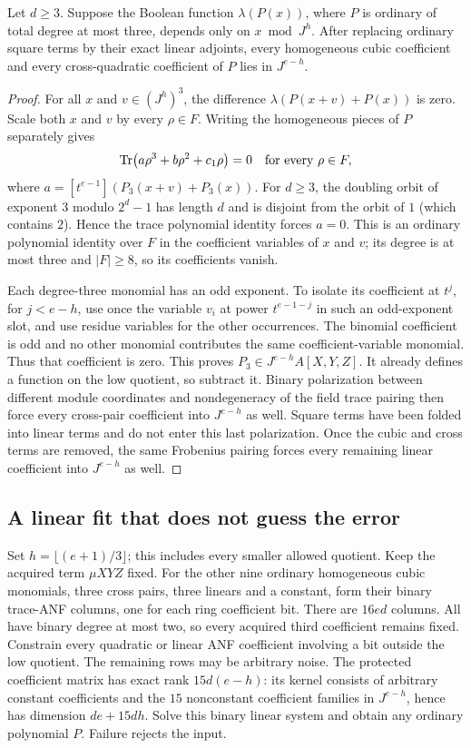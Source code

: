 \begin{lemma}\label{lem:invisible}
Let $d\ge3$. Suppose the Boolean function $\lambda(P(x))$, where $P$ is
ordinary of total degree at most three, depends only on $x\bmod J^h$.
After replacing ordinary square terms by their exact linear adjoints,
every homogeneous cubic coefficient and every cross-quadratic
coefficient of $P$ lies in $J^{e-h}$.
\end{lemma}
\begin{proof}
For all $x$ and $v\in(J^h)^3$, the difference
$\lambda(P(x+v)+P(x))$ is zero. Scale both $x$ and $v$ by every
$\rho\in F$. Writing the homogeneous pieces of $P$ separately gives
\[
 \operatorname{Tr}\bigl(a\rho^3+b\rho^2+c_1\rho\bigr)=0
 \quad\text{for every }\rho\in F,
\]
where $a=[t^{e-1}](P_3(x+v)+P_3(x))$.
For $d\ge3$, the doubling orbit of exponent $3$ modulo $2^d-1$ has
length $d$ and is disjoint from the orbit of $1$ (which contains $2$).
Hence the trace polynomial identity forces $a=0$.
This is an ordinary polynomial identity over $F$ in the coefficient
variables of $x$ and $v$; its degree is at most three and $|F|\ge8$,
so its coefficients vanish.

Each degree-three monomial has an odd exponent. To isolate its coefficient
at $t^j$, for $j<e-h$, use once the variable $v_i$ at power
$t^{e-1-j}$ in such an odd-exponent slot, and use residue variables
for the other occurrences. The binomial coefficient is odd and no other
monomial contributes the same coefficient-variable monomial. Thus that
coefficient is zero. This proves $P_3\in J^{e-h}A[X,Y,Z]$.
It already defines a function on the low quotient, so subtract it.
Binary polarization between different module coordinates and
nondegeneracy of the field trace pairing then force every cross-pair
coefficient into $J^{e-h}$ as well. Square terms have been folded into
linear terms and do not enter this last polarization. Once the cubic and
cross terms are removed, the same Frobenius pairing forces every remaining
linear coefficient into $J^{e-h}$ as well.
\end{proof}

\subsection{A linear fit that does not guess the error}
Set $h=\lfloor(e+1)/3\rfloor$; this includes every smaller allowed quotient.
Keep the acquired term $\mu XYZ$ fixed. For the other nine ordinary
homogeneous cubic monomials, three cross pairs, three linears and a
constant, form their binary trace-ANF columns, one for each ring
coefficient bit. There are $16ed$ columns. All have binary degree at
most two, so every acquired third coefficient remains fixed.
Constrain every quadratic or linear ANF coefficient involving a bit
outside the low quotient. The remaining rows may be arbitrary noise.
The protected coefficient matrix has exact rank $15d(e-h)$: its kernel
consists of arbitrary constant coefficients and the $15$ nonconstant
coefficient families in $J^{e-h}$, hence has dimension $de+15dh$.
Solve this binary linear system and obtain any ordinary polynomial $P$.
Failure rejects the input.

